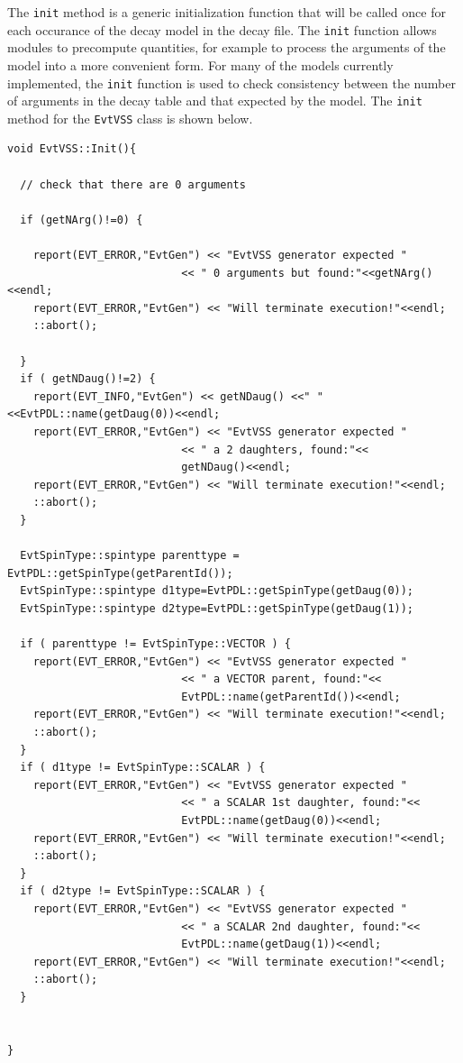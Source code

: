 The {\tt init} method is a generic
initialization function that will be called once for each occurance
of the decay model in the decay file. 
The {\tt init} function allows modules to precompute quantities, for example
to process the arguments of the
model into a more convenient form.  For many of the models
currently implemented, the {\tt init} function is used
to check consistency between the number of arguments
in the decay table and that expected by the model. The 
{\tt init} method for the {\tt EvtVSS} class
is shown below.

\begin{footnotesize}
\begin{verbatim}
void EvtVSS::Init(){

  // check that there are 0 arguments

  if (getNArg()!=0) {

    report(EVT_ERROR,"EvtGen") << "EvtVSS generator expected "
                           << " 0 arguments but found:"<<getNArg()<<endl;
    report(EVT_ERROR,"EvtGen") << "Will terminate execution!"<<endl;
    ::abort();

  }
  if ( getNDaug()!=2) {
    report(EVT_INFO,"EvtGen") << getNDaug() <<" "<<EvtPDL::name(getDaug(0))<<endl;
    report(EVT_ERROR,"EvtGen") << "EvtVSS generator expected "
                           << " a 2 daughters, found:"<<
                           getNDaug()<<endl;
    report(EVT_ERROR,"EvtGen") << "Will terminate execution!"<<endl;
    ::abort();
  }
    
  EvtSpinType::spintype parenttype = EvtPDL::getSpinType(getParentId());
  EvtSpinType::spintype d1type=EvtPDL::getSpinType(getDaug(0));
  EvtSpinType::spintype d2type=EvtPDL::getSpinType(getDaug(1));

  if ( parenttype != EvtSpinType::VECTOR ) {
    report(EVT_ERROR,"EvtGen") << "EvtVSS generator expected "
                           << " a VECTOR parent, found:"<<
                           EvtPDL::name(getParentId())<<endl;
    report(EVT_ERROR,"EvtGen") << "Will terminate execution!"<<endl;
    ::abort();
  }
  if ( d1type != EvtSpinType::SCALAR ) {
    report(EVT_ERROR,"EvtGen") << "EvtVSS generator expected "
                           << " a SCALAR 1st daughter, found:"<<
                           EvtPDL::name(getDaug(0))<<endl;
    report(EVT_ERROR,"EvtGen") << "Will terminate execution!"<<endl;
    ::abort();
  }
  if ( d2type != EvtSpinType::SCALAR ) {
    report(EVT_ERROR,"EvtGen") << "EvtVSS generator expected "
                           << " a SCALAR 2nd daughter, found:"<<
                           EvtPDL::name(getDaug(1))<<endl;
    report(EVT_ERROR,"EvtGen") << "Will terminate execution!"<<endl;
    ::abort();
  }


}
\end{verbatim}
\end{footnotesize}

